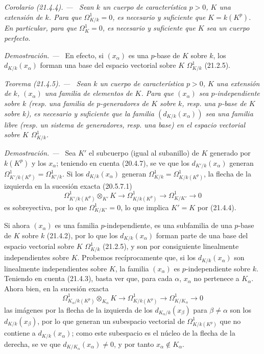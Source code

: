\documentclass[10pt,oneside]{book}
\makeatletter
\newcommand{\setmanualcurrentlabel}[1]{\def\@currentlabel{#1}}
\newcommand{\oldpage}[2][]{%
  \setcounter{footnote}{0}%
  \marginpar{\scriptsize\textbf{#1}~|~#2}\ignorespaces}
\newenvironment{theorem}[1][]{%
  \setmanualcurrentlabel{#1}\par\medskip\noindent\itshape Teorema (#1). ---\ }{\par}
\newenvironment{corollary}[1][]{%
  \setmanualcurrentlabel{#1}\par\medskip\noindent\itshape Corolario (#1). ---\ }{\par}
\newenvironment{proof}{%
  \par\medskip\noindent\textit{Demostración. ---\ }}{\par}
\makeatother
\begin{document}
\oldpage[0\textsubscript{IV-1}]{163}
\begin{corollary}[21.4.4]
\label{0.21.4.4-es}
Sean $k$ un cuerpo de característica $p>0$, $K$ una extensión de $k$.
Para que $\Omega^1_{K/k}=0$, es necesario y suficiente que $K=k(K^p)$.
En particular, para que $\Omega^1_K=0$, es necesario y suficiente que $K$ sea
un cuerpo perfecto.
\end{corollary}

\begin{proof}
En efecto, si $(x_\alpha)$ es una $p$-base de $K$ sobre $k$, los
$d_{K/k}(x_\alpha)$ forman una base del espacio vectorial sobre $K$ $\Omega^1_{K/k}$
(21.2.5).
\end{proof}

\begin{theorem}[21.4.5]
\label{0.21.4.5-es}
Sean $k$ un cuerpo de característica $p>0$, $K$ una extensión de $k$,
$(x_\alpha)$ una familia de elementos de $K$. Para que $(x_\alpha)$ sea
$p$-independiente sobre $k$ (\textup{resp.} una familia de $p$-generadores de $K$ sobre $k$,
\textup{resp.} una $p$-base de $K$ sobre $k$), es necesario y suficiente que la familia
$(d_{K/k}(x_\alpha))$ sea una familia libre (\textup{resp.} un sistema de
generadores, \textup{resp.} una base) en el espacio vectorial sobre $K$ $\Omega^1_{K/k}$.
\end{theorem}

\begin{proof}
Sea $K'$ el subcuerpo (igual al subanillo) de $K$ generado por
$k(K^p)$ y los $x_\alpha$; teniendo en cuenta (20.4.7), se ve que los
$d_{K'/k}(x_\alpha)$ generan $\Omega^1_{K'/k(K^p)}=\Omega^1_{K'/k}$. Si los
$d_{K/k}(x_\alpha)$ generan $\Omega^1_{K/k}=\Omega^1_{K/k(K^p)}$, la flecha de
la izquierda en la sucesión exacta (20.5.7.1)
\[
\Omega^1_{K'/k(K^p)}\otimes_{K'}K\to\Omega^1_{K/k(K^p)}\to\Omega^1_{K/K'}\to0
\]
es sobreyectiva, por lo que $\Omega^1_{K/K'}=0$, lo que implica $K'=K$ por (21.4.4).

Si ahora $(x_\alpha)$ es una familia $p$-independiente, es una subfamilia
de una $p$-base de $K$ sobre $k$ (21.4.2), por lo que los $d_{K/k}(x_\alpha)$ forman parte
de una base del espacio vectorial sobre $K$ $\Omega^1_{K/k}$ (21.2.5), y son por consiguiente
linealmente independientes sobre $K$. Probemos recíprocamente que, si los
$d_{K/k}(x_\alpha)$ son linealmente independientes sobre $K$, la familia
$(x_\alpha)$ es $p$-independiente sobre $k$.
\oldpage[0\textsubscript{IV-1}]{164}
Teniendo en cuenta (21.4.3), basta ver que,
para cada $\alpha$, $x_\alpha$ no pertenece a $K_\alpha$. Ahora bien, en la
sucesión exacta
\[
\Omega^1_{K_\alpha/k(K^p)}\otimes_{K_\alpha}K\longrightarrow
\Omega^1_{K/k(K^p)}\longrightarrow\Omega^1_{K/K_\alpha}\longrightarrow0
\]
las imágenes por la flecha de la izquierda de los $d_{K_\alpha/k}(x_\beta)$ para
$\beta\neq\alpha$ son los $d_{K/k}(x_\beta)$, por lo que generan un subespacio
vectorial de $\Omega^1_{K/k(K^p)}$ que no contiene a $d_{K/k}(x_\alpha)$; como
este subespacio es el núcleo de la flecha de la derecha, se ve que
$d_{K/K_\alpha}(x_\alpha)\neq0$, y por tanto $x_\alpha\notin K_\alpha$.
\end{proof}
\end{document}
